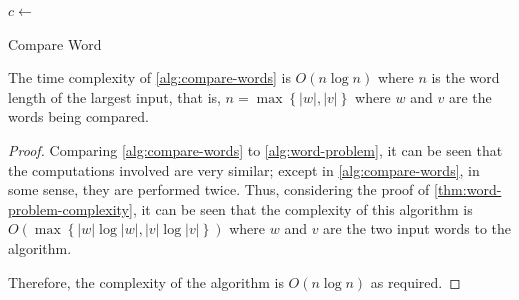 \begin{algorithm}[!ht]
{{			
			
			\BlankLine
			
			$c \gets$ \;
			
			\BlankLine
			
			
			\BlankLine
	
		}
	
		\BlankLine
	
		
		\BlankLine
		
		\;
		
	}
	
	\caption{Compare Word}
	\label{alg:compare-words}
\end{algorithm}

\begin{theorem}
	\label{thm:comparison-algorithm-complexity}
	The time complexity of \cref{alg:compare-words} is $O(n\log n)$ where $n$ is the word length of the largest input, that is, $n = \max\left\{ \left\vert w\right\vert, \left\vert v \right\vert \right\}$ where $w$ and $v$ are the words being compared.
\end{theorem}

\begin{proof}
	Comparing \cref{alg:compare-words} to \cref{alg:word-problem}, it can be seen that the computations involved are very similar; except in \cref{alg:compare-words}, in some sense, they are performed twice.
	Thus, considering the proof of \cref{thm:word-problem-complexity}, it can be seen that the complexity of this algorithm is $O(\max\left\{
		\left\vert w \right\vert \log \left\vert w \right\vert,
		\left\vert v \right\vert \log \left\vert v \right\vert
	\right\})$
	where $w$ and $v$ are the two input words to the algorithm.
	
	Therefore, the complexity of the algorithm is $O(n\log n)$ as required.
\end{proof}
